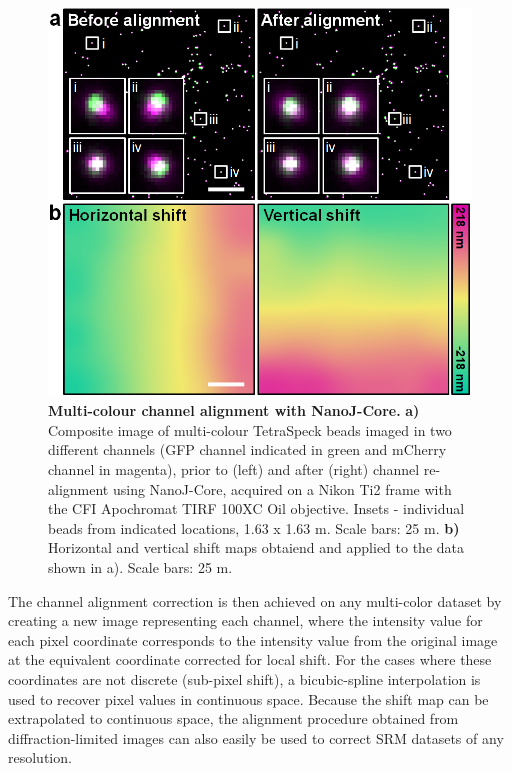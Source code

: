  \begin{figure}[!t]
    \centering
    \includegraphics[width=\linewidth]{Figures/FigureChannelAlignment_v4.png}
    \caption{\textbf{Multi-colour channel alignment with NanoJ-Core.} \textbf{a)} Composite image of multi-colour TetraSpeck beads imaged in two different channels (GFP channel indicated in green and mCherry channel in magenta), prior to (left) and after (right) channel re-alignment using NanoJ-Core, acquired on a Nikon Ti2 frame with the CFI Apochromat TIRF 100XC Oil objective. Insets - individual beads from indicated locations, 1.63 x 1.63 \micro m. Scale bars: 25 \micro m. \textbf{b)} Horizontal and vertical shift maps obtaiend and applied to the data shown in a). Scale bars: 25 \micro m.}
    \label{fig:ChannelAlignment}
\end{figure}
 
 The channel alignment correction is then achieved on any multi-color dataset by creating a new image representing each channel, where the intensity value for each pixel coordinate corresponds to the intensity value from the original image at the equivalent coordinate corrected for local shift. For the cases where these coordinates are not discrete (sub-pixel shift), a bicubic-spline interpolation is used to recover pixel values in continuous space. Because the shift map can be extrapolated to continuous space, the alignment procedure obtained from diffraction-limited images can also easily be used to correct SRM datasets of any resolution. 
 

